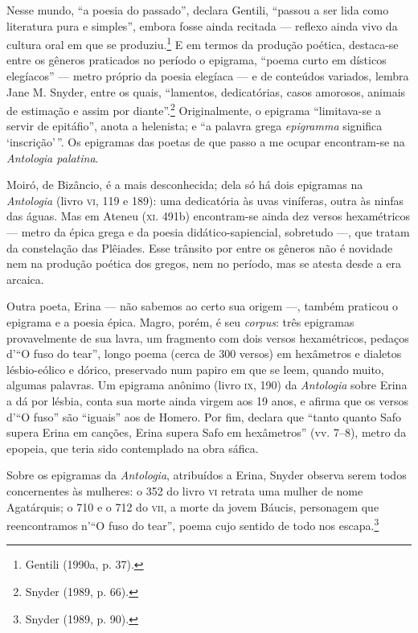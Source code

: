 Nesse mundo, “a poesia do passado”, declara Gentili, “passou a
ser lida como literatura pura e simples”, embora fosse ainda recitada --- reflexo
ainda vivo da cultura oral em que se produziu.\footnote{ Gentili (1990a, p. 37).} E em termos da produção poética,
destaca-se entre os gêneros praticados no período o epigrama, “poema curto em
dísticos elegíacos” --- metro próprio da poesia elegíaca --- e de conteúdos
variados, lembra Jane M. Snyder, entre os quais, “lamentos,
dedicatórias, casos amorosos, animais de estimação e assim por diante”.\footnote{ Snyder (1989, p. 66).}
Originalmente, o epigrama “limitava-se a servir de epitáfio”, anota a
helenista; e “a palavra grega \textit{epigramma} significa ‘inscrição’\,”. Os
epigramas das poetas de que passo a me ocupar encontram-se na \textit{Antologia
palatina}.

Moiró, de Bizâncio, é a mais desconhecida; dela só há dois epigramas na
\textit{Antologia} (livro \textsc{vi}, 119 e 189): uma dedicatória às uvas viníferas,
outra às ninfas das águas. Mas em Ateneu (\textsc{xi}. 491b) encontram-se ainda dez
versos hexamétricos --- metro da épica grega e da poesia didático-sapiencial,
sobretudo ---, que tratam da constelação das Plêiades. Esse trânsito por entre os
gêneros não é novidade nem na produção poética dos gregos, nem no período, mas
se atesta desde a era arcaica.

Outra poeta, Erina --- não sabemos ao certo sua origem ---, também praticou o
epigrama e a poesia épica. Magro, porém, é seu \textit{corpus}: três epigramas
provavelmente de sua lavra, um fragmento com dois versos hexamétricos, pedaços
d’“O fuso do tear”, longo poema (cerca de 300 versos) em hexâmetros e dialetos
lésbio-eólico e dórico, preservado num papiro em que se leem, quando muito,
algumas palavras. Um epigrama anônimo (livro \textsc{ix}, 190) da \textit{Antologia}
sobre Erina a dá por lésbia, conta sua morte ainda virgem aos 19 anos, e
afirma que os versos d’“O fuso” são ``iguais” aos de Homero. Por fim,
declara que ``tanto quanto Safo supera Erina em canções, Erina supera
Safo em hexâmetros” (vv. 7--8), metro da epopeia, que teria sido contemplado na
obra sáfica.

Sobre os epigramas da \textit{Antologia}, atribuídos a Erina, Snyder observa
serem todos concernentes às mulheres: o 352 do livro \textsc{vi}
retrata uma mulher de nome Agatárquis; o 710 e o 712 do \textsc{vii}, a morte da jovem
Báucis, personagem que reencontramos n’“O fuso do tear”, poema cujo sentido de
todo nos escapa.\footnote{ Snyder (1989, p. 90).}

